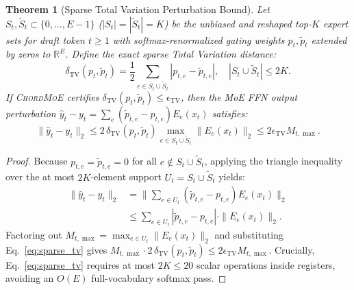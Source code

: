 \documentclass[10pt,twocolumn]{article}
\newtheorem{theorem}{Theorem}
\theoremstyle{definition}
\begin{document}
\begin{theorem}[Sparse Total Variation Perturbation Bound]
\label{thm:tv}
Let $S_t, \tilde{S}_t \subset \{0,\dots,E-1\}$ ($|S_t| = |\tilde{S}_t| = K$) be the unbiased and reshaped top-$K$ expert sets for draft token $t \ge 1$ with softmax-renormalized gating weights $p_t, \tilde{p}_t$ extended by zeros to $\mathbb{R}^E$. Define the exact sparse Total Variation distance:
\begin{equation}
  \delta_{\mathrm{TV}}(p_t, \tilde{p}_t) = \frac{1}{2}\sum_{e \in S_t \cup \tilde{S}_t} |p_{t,e} - \tilde{p}_{t,e}|, \quad |S_t \cup \tilde{S}_t| \le 2K.
  \label{eq:sparse_tv}
\end{equation}
If \textsc{ChordMoE} certifies $\delta_{\mathrm{TV}}(p_t, \tilde{p}_t) \le \epsilon_{\mathrm{TV}}$, then the MoE FFN output perturbation $\hat{y}_t - y_t = \sum_{e} (\tilde{p}_{t,e} - p_{t,e}) E_e(x_t)$ satisfies:
\begin{equation}
  \|\hat{y}_t - y_t\|_2 \le 2\,\delta_{\mathrm{TV}}(p_t, \tilde{p}_t) \max_{e \in S_t \cup \tilde{S}_t} \|E_e(x_t)\|_2 \le 2\epsilon_{\mathrm{TV}} M_{t,\max}.
  \label{eq:l2_bound}
\end{equation}
\end{theorem}

\begin{proof}
Because $p_{t,e} = \tilde{p}_{t,e} = 0$ for all $e \notin S_t \cup \tilde{S}_t$, applying the triangle inequality over the at most $2K$-element support $U_t = S_t \cup \tilde{S}_t$ yields:
\[
  \begin{aligned}
    \|\hat{y}_t - y_t\|_2 &= \Big\|\sum_{e \in U_t} (\tilde{p}_{t,e} - p_{t,e}) E_e(x_t)\Big\|_2 \\
    &\le \sum_{e \in U_t} |\tilde{p}_{t,e} - p_{t,e}| \cdot \|E_e(x_t)\|_2.
  \end{aligned}
\]
Factoring out $M_{t,\max} = \max_{e \in U_t} \|E_e(x_t)\|_2$ and substituting Eq.~\eqref{eq:sparse_tv} gives $M_{t,\max} \cdot 2\,\delta_{\mathrm{TV}}(p_t, \tilde{p}_t) \le 2\epsilon_{\mathrm{TV}} M_{t,\max}$. Crucially, Eq.~\eqref{eq:sparse_tv} requires at most $2K \le 20$ scalar operations inside registers, avoiding an $O(E)$ full-vocabulary softmax pass.
\end{proof}
\end{document}
